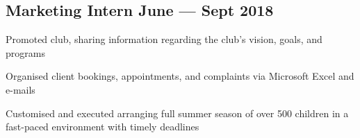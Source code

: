 \documentclass[letter,10pt]{article}
\begin{document}
\subsection{{Marketing Intern \hfill  June --- Sept 2018}}
\begin{zitemize}
\item Promoted club, sharing information regarding the club's vision, goals, and programs
\item Organised client bookings, appointments, and complaints via Microsoft Excel and e-mails
\item Customised and executed arranging full summer season of over 500 children in a fast-paced environment with timely deadlines
\end{zitemize}

\end{document}
